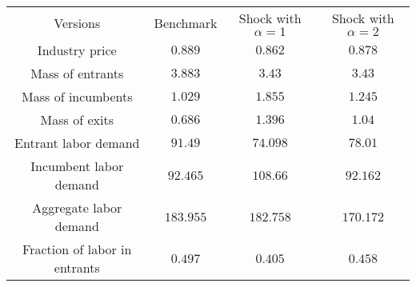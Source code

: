 \begin{tabular}{cccc}
Versions & Benchmark & Shock with $\alpha = 1$ & Shock with $\alpha = 2$\\
Industry price  & $0.889$ & $0.862$ & $0.878$\\
Mass of entrants & $3.883$ & $3.43$ & $3.43$\\
Mass of incumbents & $1.029$ & $1.855$ & $1.245$\\
Mass of exits & $0.686$ & $1.396$ & $1.04$\\
Entrant labor demand & $91.49$ & $74.098$ & $78.01$\\
Incumbent labor demand  & $92.465$ & $108.66$ & $92.162$\\
Aggregate labor demand  & $183.955$ & $182.758$ & $170.172$\\
Fraction of labor in entrants & $0.497$ & $0.405$ & $0.458$\\
\end{tabular}